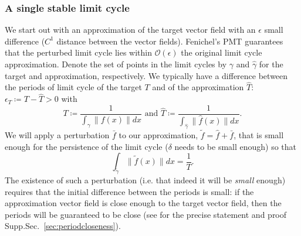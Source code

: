 \documentclass{article}
\theoremstyle{definition} \newtheorem{definition}{Definition}
\theoremstyle{remark} \newtheorem{remark}{Remark}
\newcounter{ct}
\begin{document}
\subsubsection{A single stable limit cycle}
We start out with an approximation of the target vector field with an $\epsilon$ small difference ($C^1$ distance between the vector fields).
Fenichel's PMT guarantees that the perturbed limit cycle lies within $\mathcal{O}(\epsilon)$ the original limit cycle approximation.
Denote the set of points in the limit cycles by $\gamma$ and $\hat\gamma$ for the target and approximation, respectively.
%
We typically have a difference between the periods of limit cycle of the target $T$ and of the approximation $\hat T$: $\epsilon_T\coloneqq T-\hat T>0$
with \[T\coloneqq\frac{1}{\int_{\gamma}\|f(x)\|dx} \text{ and } \hat T\coloneqq\frac{1}{\int_{\hat{\gamma}}\|\hat f(x)\|dx}.\]
%
We will apply a perturbation $\bar{f}$ to our approximation, $\tilde f = \hat f + \bar f$, that is small enough for the persistence of the limit cycle ($\delta$ needs to be small enough) 
so that 
\begin{equation}\label{eq:lc_constraint}
\int_{\tilde{\gamma}}\|\tilde{f}(x)\| dx = \frac{1}{T}. 	%
\end{equation}
The existence of such a perturbation (i.e. that indeed it will be \emph{small} enough) requires that the initial difference between the periods is small:
if the approximation vector field is close enough to the target vector field, then the periods will be guaranteed to be close (see for the precise statement and proof Supp.Sec.~\ref{sec:periodcloseness}).
\end{document}
